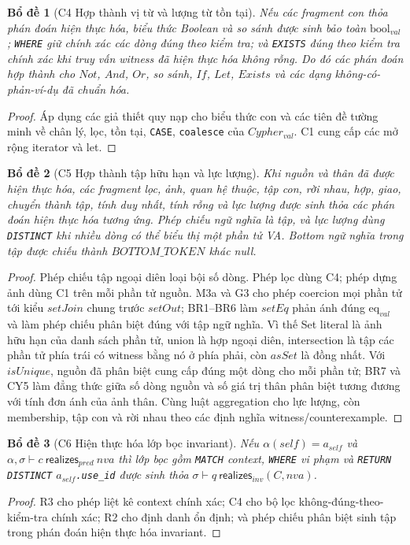 \documentclass[11pt,a4paper]{article}
\newtheorem{lemma}{Bổ đề}
\theoremstyle{definition}
\newcommand{\boolval}{\mathrm{bool}_{val}}
\newcommand{\eqval}{\mathrm{eq}_{val}}
\begin{document}
\begin{lemma}[C4 Hợp thành vị từ và lượng từ tồn tại]
Nếu các fragment con thỏa phán đoán hiện thực hóa, biểu thức Boolean và so sánh
được sinh bảo toàn $\boolval$; \texttt{WHERE} giữ chính xác các dòng đúng theo
kiểm tra; và \texttt{EXISTS} đúng theo kiểm tra chính xác khi truy vấn witness
đã hiện thực hóa không rỗng. Do đó các phán đoán hợp thành cho $Not$, $And$,
$Or$, so sánh, $If$, $Let$, $Exists$ và các dạng không-có-phản-ví-dụ đã chuẩn hóa.
\end{lemma}
\begin{proof}
Áp dụng các giả thiết quy nạp cho biểu thức con và các tiên đề tường minh về
chân lý, lọc, tồn tại, \texttt{CASE}, \texttt{coalesce} của $Cypher_{val}$.
C1 cung cấp các mở rộng iterator và let.
\end{proof}

\begin{lemma}[C5 Hợp thành tập hữu hạn và lực lượng]
Khi nguồn và thân đã được hiện thực hóa, các fragment lọc, ảnh, quan hệ thuộc,
tập con, rời nhau, hợp, giao, chuyển thành tập, tính duy nhất, tính rỗng và lực lượng được sinh thỏa các phán đoán hiện thực
hóa tương ứng. Phép chiếu ngữ nghĩa là tập, và lực lượng dùng \texttt{DISTINCT}
khi nhiều dòng có thể biểu thị một phần tử VA. Bottom ngữ nghĩa trong tập được
chiếu thành $BOTTOM\_TOKEN$ khác null.
\end{lemma}
\begin{proof}
Phép chiếu tập ngoại diên loại bội số dòng. Phép lọc dùng C4; phép dựng ảnh dùng
C1 trên mỗi phần tử nguồn. M3a và G3 cho phép coercion mọi phần tử tới kiểu
$setJoin$ chung trước $setOut$; BR1--BR6 làm $setEq$ phản ánh đúng
$\eqval$ và làm phép chiếu phân biệt đúng với tập ngữ nghĩa. Vì thế Set literal
là ảnh hữu hạn của danh sách phần tử, union là hợp ngoại diên, intersection là
tập các phần tử phía trái có witness bằng nó ở phía phải, còn $asSet$ là đồng
nhất. Với $isUnique$, nguồn đã phân biệt cung cấp đúng một dòng cho mỗi phần tử;
BR7 và CY5 làm đẳng thức giữa số dòng nguồn và số giá trị thân phân biệt tương
đương với tính đơn ánh của ảnh thân. Cùng luật aggregation cho lực lượng, còn
membership, tập con và rời nhau theo các định nghĩa witness/counterexample.
\end{proof}

\begin{lemma}[C6 Hiện thực hóa lớp bọc invariant]
Nếu $\alpha(self)=a_{self}$ và
$\alpha,\sigma\vdash c\ \mathsf{realizes}_{pred}\ nva$ thì lớp bọc gồm
\texttt{MATCH} context, \texttt{WHERE} vi phạm và
\texttt{RETURN DISTINCT} $a_{self}$\texttt{.use\_id} được sinh thỏa
$\sigma\vdash q\ \mathsf{realizes}_{inv}(C,nva)$.
\end{lemma}
\begin{proof}
R3 cho phép liệt kê context chính xác; C4 cho bộ lọc không-đúng-theo-kiểm-tra
chính xác; R2 cho định danh ổn định; và phép chiếu phân biệt sinh tập trong
phán đoán hiện thực hóa invariant.
\end{proof}
\end{document}

